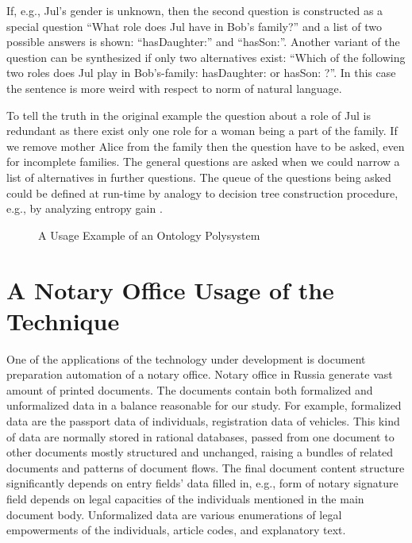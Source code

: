 \documentclass[conference]{IEEEtran}
\begin{document}
If, e.g., Jul's gender is unknown, then the second question is
constructed as a special question ``What role does Jul have in Bob's
family?'' and a list of two possible answers is shown:
``hasDaughter:'' and ``hasSon:''.  Another variant of the question can
be synthesized if only two alternatives exist: ``Which of the
following two roles does Jul play in Bob's-family: hasDaughter: or
hasSon: ?''.  In this case the sentence is more weird with respect to
norm of natural language.

To tell the truth in the original example the question about a role of
Jul is redundant as there exist only one role for a woman being a part
of the family.  If we remove mother Alice from the family then the
question have to be asked, even for incomplete families.  The general
questions are asked when we could narrow a list of alternatives in
further questions.  The queue of the questions being asked could be
defined at run-time by analogy to decision tree construction
procedure, e.g., by analyzing entropy gain \cite{dectrees}.

\begin{figure}
\centering\footnotesize\sf
\def\svgwidth{0.9\linewidth}

\caption{A Usage Example of an Ontology Polysystem}
\label{OPSA}
\end{figure}









\section{A Notary Office Usage of the Technique}

One of the applications of the technology under development is
document preparation automation of a notary office.  Notary office in
Russia generate vast amount of printed documents.  The documents
contain both formalized and unformalized data in a balance reasonable
for our study.  For example, formalized data are the passport data of
individuals, registration data of vehicles.  This kind of data are
normally stored in rational databases, passed from one document to
other documents mostly structured and unchanged, raising a bundles of
related documents and patterns of document flows.  The final document
content structure significantly depends on entry fields’ data filled
in, e.g., form of notary signature field depends on legal capacities of the
individuals mentioned in the main document body.
Unformalized data are various enumerations of legal empowerments of
the individuals, article codes, and explanatory text.
\end{document}
